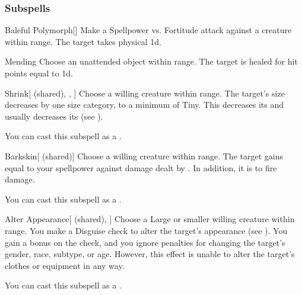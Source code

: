 \subsubsection{Subspells}


\begin{ability}[\nth{1}]{Baleful Polymorph}[]
Make a Spellpower vs. Fortitude attack against a creature within \rngmed range.
\hit The target takes physical  \plus1d.
\end{ability}
\vspace{0.25em}


\begin{ability}[\nth{1}]{Mending}
Choose an unattended object within \rngclose range.
The target is healed for hit points equal to  \plus1d.
\end{ability}
\vspace{0.25em}


\begin{ability}[\nth{1}]{Shrink}[ (shared), , ]
Choose a willing creature within \rngclose range.
The target's size decreases by one size category, to a minimum of Tiny.
This decreases its  and usually decreases its  (see ).

You can cast this subspell as a .
\end{ability}
\vspace{0.25em}


\begin{ability}[\nth{2}]{Barkskin}[ (shared)]
Choose a willing creature within \rngclose range.
The target gains  equal to your spellpower against damage dealt by .
In addition, it is  to fire damage.

You can cast this subspell as a .
\end{ability}
\vspace{0.25em}


\begin{ability}[\nth{3}]{Alter Appearance}[ (shared), ]
Choose a Large or smaller willing creature within \rngclose range.
You make a Disguise check to alter the target's appearance (see ).
You gain a  bonus on the check, and you ignore penalties for changing the target's gender, race, subtype, or age.
However, this effect is unable to alter the target's clothes or equipment in any way.

You can cast this subspell as a .
\end{ability}
\vspace{0.25em}


